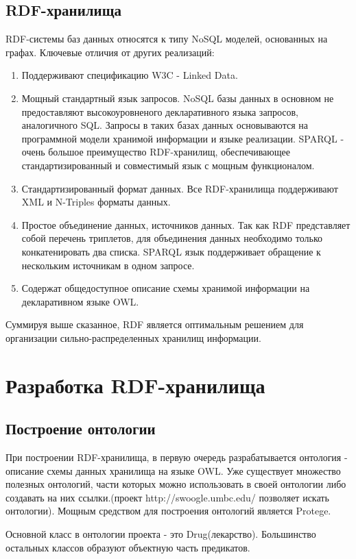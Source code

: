 \documentclass[specialist,subf,href,colorlinks=true
]{disser}
\begin{document}
\section{RDF-хранилища}
RDF-системы баз данных относятся к типу NoSQL моделей, основанных на графах. Ключевые отличия от других реализаций:
\begin{enumerate}
 \item Поддерживают спецификацию W3C - Linked Data. 
 \item Мощный стандартный язык запросов. NoSQL базы данных в основном не предоставляют высокоуровненого декларативного языка запросов, аналогичного SQL. Запросы в таких базах данных основываются на программной модели хранимой информации и языке реализации. SPARQL - очень большое преимущество RDF-хранилищ, обеспечивающее стандартизированный и совместимый язык с мощным функционалом. 
 \item Стандартизированный формат данных. Все RDF-хранилища поддерживают XML и N-Triples форматы данных.
 \item Простое объединение данных, источников данных. Так как RDF представляет собой перечень триплетов, для объединения данных необходимо только конкатенировать два списка. SPARQL язык поддерживает обращение к нескольким источникам в одном запросе.
 \item Содержат общедоступное описание схемы хранимой информации на декларативном языке OWL.
\end{enumerate}
 
Суммируя выше сказанное, RDF является оптимальным решением для организации сильно-распределенных хранилищ информации. 

\chapter{Разработка RDF-хранилища}

\section{Построение онтологии}
При построении RDF-хранилища, в первую очередь разрабатывается онтология - описание схемы данных хранилища на языке OWL. Уже существует множество полезных онтологий, части которых можно использовать в своей онтологии либо создавать на них ссылки.(проект http://swoogle.umbc.edu/ позволяет искать онтологии). Мощным средством для построения онтологий является Protege.

Основной класс в онтологии проекта - это Drug(лекарство). Большинство остальных классов образуют объектную часть предикатов.
\end{document}
